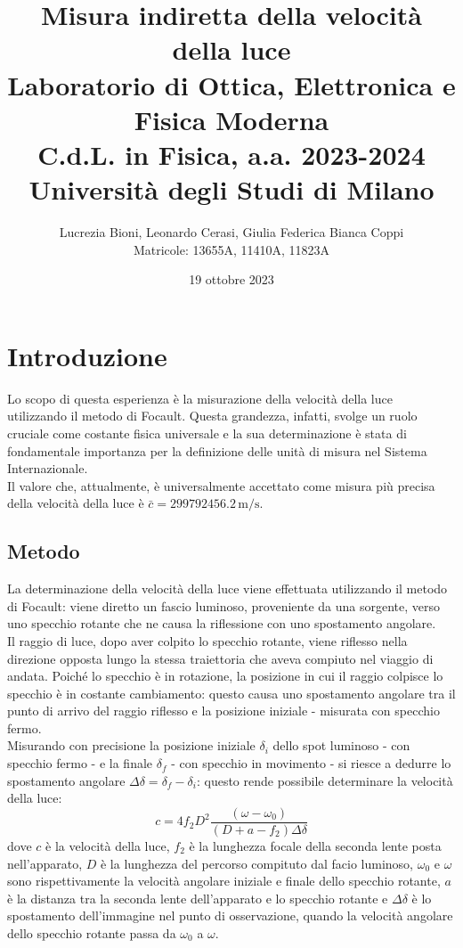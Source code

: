 \documentclass[]{article}
\title{%
    \Huge Misura indiretta della velocità della luce \\
    \Large Laboratorio di Ottica, Elettronica e Fisica Moderna \\ C.d.L. in Fisica, a.a. 2023-2024 \\ Università degli Studi di Milano}
\author{\LARGE Lucrezia Bioni, Leonardo Cerasi, Giulia Federica Bianca Coppi \\ Matricole: 13655A, 11410A, 11823A}
\date{19 ottobre 2023}
\let\oldsection\section%
\renewcommand{\section}{%
	\renewcommand{\theequation}{\thesection.\arabic{equation}}%
	\oldsection}%
\let\oldsubsection\subsection%
\renewcommand{\subsection}{%
	\renewcommand{\theequation}{\thesubsection.\arabic{equation}}%
	\oldsubsection}%
\begin{document}
    \maketitle

    \section{Introduzione}

    Lo scopo di questa esperienza è la misurazione della velocità della luce utilizzando 
    il metodo di Focault. Questa grandezza, infatti, svolge un ruolo cruciale come costante 
    fisica universale e la sua determinazione è stata di fondamentale importanza per la definizione 
    delle unità di misura nel Sistema Internazionale. \\
    Il valore che, attualmente, è universalmente accettato come misura più precisa della velocità della luce è $\bar{c} = 299792456.2 \,\text{m/s}$.

    \subsection{Metodo}
    
    La determinazione della velocità della luce viene effettuata utilizzando il metodo di Focault: 
    viene diretto un fascio luminoso, proveniente da una sorgente, verso uno specchio rotante che ne causa la riflessione con uno spostamento angolare.\\
    Il raggio di luce, dopo aver colpito lo specchio rotante, viene riflesso nella direzione opposta lungo la stessa traiettoria che aveva compiuto nel viaggio di andata. Poiché lo specchio è in rotazione, la posizione in cui il raggio colpisce lo specchio è in costante cambiamento: questo causa uno spostamento angolare tra il punto di arrivo del raggio riflesso e la posizione iniziale - misurata con specchio fermo.\\
    Misurando con precisione la posizione iniziale $ \delta _i $ dello spot luminoso - con specchio fermo - e la finale  $ \delta _f $ - con specchio in movimento - si riesce a dedurre lo spostamento angolare $ \Delta \delta = \delta_f - \delta_i $: questo rende possibile determinare la velocità della luce:
    \begin{equation}
        \label{eqn-c}
        c=4 f_2 D^2 \frac{(\omega -\omega_0)}{(D+a-f_2)\Delta \delta }
    \end{equation}
    dove $ c $ è la velocità della luce, $ f_2 $ è la lunghezza focale della seconda lente posta nell'apparato, $ D $ è la lunghezza del percorso compituto dal facio luminoso, $ \omega_0 $ e $ \omega $ sono rispettivamente la velocità angolare iniziale e finale dello specchio rotante, $ a $ è la distanza tra la seconda lente dell'apparato e lo specchio rotante e $ \Delta\delta$ è lo spostamento dell'immagine nel punto di osservazione, quando la velocità angolare dello specchio rotante passa da $ \omega_0 $ a $ \omega $.
\end{document}

